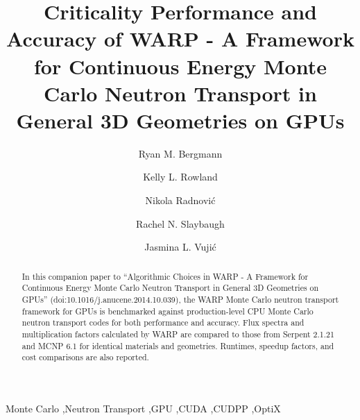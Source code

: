 \documentclass[preprint,12pt]{elsarticle}
\begin{document}
\begin{frontmatter}



\title{Criticality Performance and Accuracy of WARP - A Framework for Continuous Energy Monte Carlo Neutron Transport in General 3D Geometries on GPUs}


\author{Ryan M. Bergmann}

\author{Kelly L. Rowland}

\author{Nikola Radnovi\'c}

\author{Rachel N. Slaybaugh}

\author{Jasmina L. Vuji\'c}


\address{Department of Nuclear Engineering, 
4155 Etcheverry Hall, 
University of California - Berkeley,
Berkeley, CA 94720-1730}

\begin{abstract}

In this companion paper to ``Algorithmic Choices in WARP - A Framework for Continuous Energy Monte Carlo Neutron Transport in General 3D Geometries on GPUs'' (doi:10.1016/j.anucene.2014.10.039), the WARP Monte Carlo neutron transport framework for GPUs is benchmarked against production-level CPU Monte Carlo neutron transport codes for both performance and accuracy.  Flux spectra and multiplication factors calculated by WARP are compared to those from Serpent 2.1.21 and MCNP 6.1 for identical materials and geometries.  Runtimes, speedup factors, and cost comparisons are also reported.

\end{abstract}

\begin{keyword}
Monte Carlo \sep Neutron Transport \sep GPU \sep CUDA \sep CUDPP \sep OptiX


\end{keyword}

\end{frontmatter}
\end{document}
